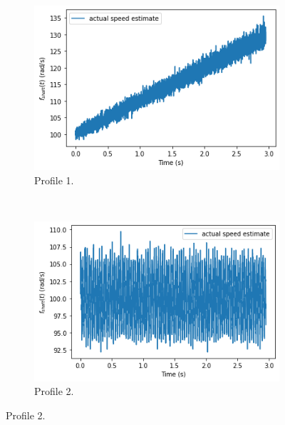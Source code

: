 \documentclass{article}
\begin{document}
	\begin{figure}[htb!]
		\centering
		\begin{subfigure}[b]{0.45\textwidth}
			\centering
			\includegraphics[width=\textwidth]{Q4_f1_actual.png}
			\caption{Profile 1.}
		\end{subfigure}
		~
		\begin{subfigure}[b]{0.45\textwidth}
			\centering
			\includegraphics[width=\textwidth]{Q4_f2_actual.png}
			\caption{Profile 2.}
		\end{subfigure}
		

\end{figure}
\end{document}
